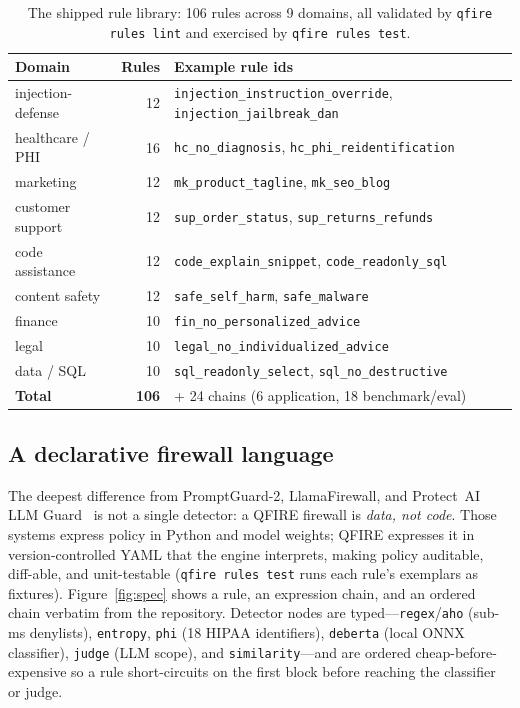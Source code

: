 \documentclass[11pt]{article}
\begin{document}
\begin{table}[H]\centering\small
\begin{tabular}{lrl}
\toprule
Domain & Rules & Example rule ids \\
\midrule
injection-defense & 12 & \texttt{injection\_instruction\_override}, \texttt{injection\_jailbreak\_dan} \\
healthcare / PHI  & 16 & \texttt{hc\_no\_diagnosis}, \texttt{hc\_phi\_reidentification} \\
marketing         & 12 & \texttt{mk\_product\_tagline}, \texttt{mk\_seo\_blog} \\
customer support  & 12 & \texttt{sup\_order\_status}, \texttt{sup\_returns\_refunds} \\
code assistance   & 12 & \texttt{code\_explain\_snippet}, \texttt{code\_readonly\_sql} \\
content safety    & 12 & \texttt{safe\_self\_harm}, \texttt{safe\_malware} \\
finance           & 10 & \texttt{fin\_no\_personalized\_advice} \\
legal             & 10 & \texttt{legal\_no\_individualized\_advice} \\
data / SQL        & 10 & \texttt{sql\_readonly\_select}, \texttt{sql\_no\_destructive} \\
\midrule
\textbf{Total}    & \textbf{106} & + 24 chains (6 application, 18 benchmark/eval) \\
\bottomrule
\end{tabular}
\caption{The shipped rule library: 106 rules across 9 domains, all validated by
\texttt{qfire rules lint} and exercised by \texttt{qfire rules test}.}
\label{tab:library}
\end{table}

\subsection{A declarative firewall language}\label{sec:language}
The deepest difference from PromptGuard-2, LlamaFirewall, and Protect~AI LLM Guard~\cite{protectai_llmguard}
is not a single detector: a QFIRE firewall is \emph{data, not code}. Those systems
express policy in Python and model weights; QFIRE expresses it in
version-controlled YAML that the engine interprets, making policy auditable,
diff-able, and unit-testable (\texttt{qfire rules test} runs each rule's exemplars
as fixtures). Figure~\ref{fig:spec} shows a rule, an expression chain, and an
ordered chain verbatim from the repository. Detector nodes are typed---\texttt{regex}/\texttt{aho} (sub-ms
denylists), \texttt{entropy}, \texttt{phi} (18 HIPAA identifiers),
\texttt{deberta} (local ONNX classifier), \texttt{judge} (LLM scope), and
\texttt{similarity}---and are ordered cheap-before-expensive so a rule
short-circuits on the first block before reaching the classifier or judge.
\end{document}
